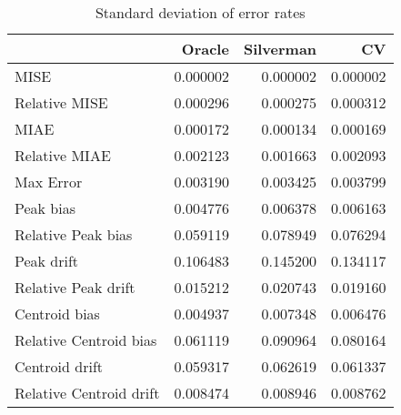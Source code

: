 \begin{table}[ht]
\centering
\begin{tabular}{lrrr}
  \hline
 & Oracle & Silverman & CV \\ 
  \hline
MISE & 0.000002 & 0.000002 & 0.000002 \\ 
  Relative MISE & 0.000296 & 0.000275 & 0.000312 \\ 
  MIAE & 0.000172 & 0.000134 & 0.000169 \\ 
  Relative MIAE & 0.002123 & 0.001663 & 0.002093 \\ 
  Max Error & 0.003190 & 0.003425 & 0.003799 \\ 
  Peak bias & 0.004776 & 0.006378 & 0.006163 \\ 
  Relative Peak bias & 0.059119 & 0.078949 & 0.076294 \\ 
  Peak drift & 0.106483 & 0.145200 & 0.134117 \\ 
  Relative Peak drift & 0.015212 & 0.020743 & 0.019160 \\ 
  Centroid bias & 0.004937 & 0.007348 & 0.006476 \\ 
  Relative Centroid bias & 0.061119 & 0.090964 & 0.080164 \\ 
  Centroid drift & 0.059317 & 0.062619 & 0.061337 \\ 
  Relative Centroid drift & 0.008474 & 0.008946 & 0.008762 \\ 
   \hline
\end{tabular}
\caption{Standard deviation of error rates} 
\label{tbl:stddev_error_rates}
\end{table}
